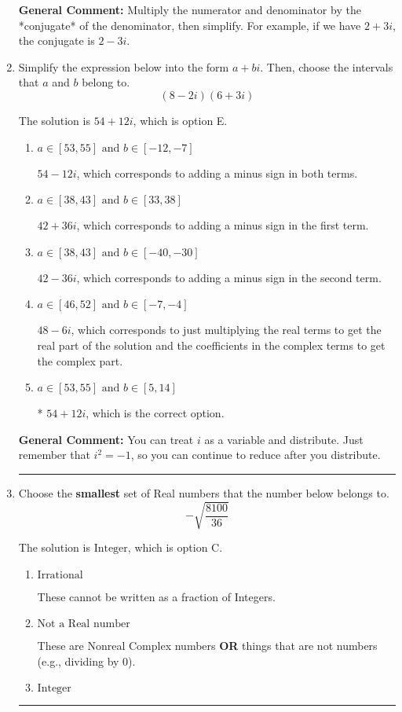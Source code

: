 \documentclass{extbook}[14pt]
\newcommand{\litem}[1]{\item #1

\rule{\textwidth}{0.4pt}}
\begin{document}
\begin{enumerate}
{\textbf{General Comment:} Multiply the numerator and denominator by the *conjugate* of the denominator, then simplify. For example, if we have $2+3i$, the conjugate is $2-3i$.
}
\litem{
Simplify the expression below into the form $a+bi$. Then, choose the intervals that $a$ and $b$ belong to.
\[ (8 - 2 i)(6 + 3 i) \]

The solution is \( 54 + 12 i \), which is option E.\begin{enumerate}[label=\Alph*.]
\item \( a \in [53, 55] \text{ and } b \in [-12, -7] \)

 $54 - 12 i$, which corresponds to adding a minus sign in both terms.
\item \( a \in [38, 43] \text{ and } b \in [33, 38] \)

 $42 + 36 i$, which corresponds to adding a minus sign in the first term.
\item \( a \in [38, 43] \text{ and } b \in [-40, -30] \)

 $42 - 36 i$, which corresponds to adding a minus sign in the second term.
\item \( a \in [46, 52] \text{ and } b \in [-7, -4] \)

 $48 - 6 i$, which corresponds to just multiplying the real terms to get the real part of the solution and the coefficients in the complex terms to get the complex part.
\item \( a \in [53, 55] \text{ and } b \in [5, 14] \)

* $54 + 12 i$, which is the correct option.
\end{enumerate}

\textbf{General Comment:} You can treat $i$ as a variable and distribute. Just remember that $i^2=-1$, so you can continue to reduce after you distribute.
}
\litem{
Choose the \textbf{smallest} set of Real numbers that the number below belongs to.
\[ -\sqrt{\frac{8100}{36}} \]

The solution is \( \text{Integer} \), which is option C.\begin{enumerate}[label=\Alph*.]
\item \( \text{Irrational} \)

These cannot be written as a fraction of Integers.
\item \( \text{Not a Real number} \)

These are Nonreal Complex numbers \textbf{OR} things that are not numbers (e.g., dividing by 0).
\item \( \text{Integer} \)


\end{enumerate}}
\end{enumerate}
\end{document}
